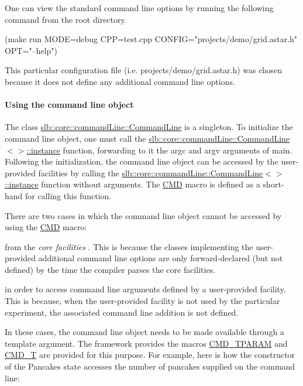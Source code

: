One can view the standard command line options by running the following command from the root directory. \begin{DoxyVerb}(make run MODE=debug CPP=test.cpp CONFIG="projects/demo/grid.astar.h" OPT="--help")
\end{DoxyVerb}
 This particular configuration file (i.\+e. {\ttfamily projects/demo/grid.\+astar.\+h}) was chosen because it does not define any additional command line options.\hypertarget{index_s-singleton}{}\paragraph{Using the command line object}\label{index_s-singleton}
The class \hyperlink{structslb_1_1core_1_1commandLine_1_1CommandLine}{slb\+::core\+::command\+Line\+::\+Command\+Line} is a singleton. To initialize the command line object, one must call the \hyperlink{structslb_1_1core_1_1commandLine_1_1CommandLine_a297df54d1f330d491717b487968b0fc5}{slb\+::core\+::command\+Line\+::\+Command\+Line$<$$>$\+::instance} function, forwarding to it the {\ttfamily argc} and {\ttfamily argv} arguments of {\ttfamily main}. Following the initialization, the command line object can be accessed by the user-\/provided facilities by calling the \hyperlink{structslb_1_1core_1_1commandLine_1_1CommandLine_a297df54d1f330d491717b487968b0fc5}{slb\+::core\+::command\+Line\+::\+Command\+Line$<$$>$\+::instance} function without arguments. The \hyperlink{command__line_8h_a0a5ceb9ceb914e08d345410b561cb37a}{C\+MD} macro is defined as a short-\/hand for calling this function.

There are two cases in which the command line object cannot be accessed by using the \hyperlink{command__line_8h_a0a5ceb9ceb914e08d345410b561cb37a}{C\+MD} macro\+:
\begin{DoxyItemize}
\item from the {\itshape core facilities} . This is because the classes implementing the user-\/provided additional command line options are only forward-\/declared (but not defined) by the time the compiler parses the core facilities.
\item in order to access command line arguments defined by a user-\/provided facility. This is because, when the user-\/provided facility is not used by the particular experiment, the associated command line addition is not defined.
\end{DoxyItemize}

In these cases, the command line object needs to be made available through a template argument. The framework provides the macros \hyperlink{command__line_8h_afba6f100063f1d8dec752ed393ff4e92}{C\+M\+D\+\_\+\+T\+P\+A\+R\+AM} and \hyperlink{command__line_8h_ad2bdd5f5511ceff17570c461fe447a56}{C\+M\+D\+\_\+T} are provided for this purpose. For example, here is how the constructor of the Pancake\textquotesingle{}s state accesses the number of pancakes supplied on the command line\+:


